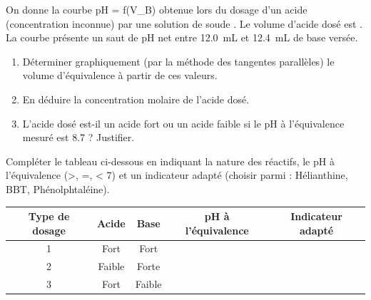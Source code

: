 \documentclass[11pt]{article}
\begin{document}
\begin{exercice}
On donne la courbe pH = f(V\_B) obtenue lors du dosage d'un acide (concentration inconnue) par une solution de soude . Le volume d'acide dosé est . La courbe présente un saut de pH net entre \SI{12,0}{mL} et \SI{12,4}{mL} de base versée.
\begin{enumerate}
    \item Déterminer graphiquement (par la méthode des tangentes parallèles) le volume d'équivalence  à partir de ces valeurs.
    \item En déduire la concentration molaire  de l'acide dosé.
    \item L'acide dosé est-il un acide fort ou un acide faible si le pH à l'équivalence mesuré est \num{8,7} ? Justifier.
\end{enumerate}
\end{exercice}

\begin{exercice}
Compléter le tableau ci-dessous en indiquant la nature des réactifs, le pH à l'équivalence (>, =, < 7) et un indicateur adapté (choisir parmi : Hélianthine, BBT, Phénolphtaléine).

\begin{tabular}{|c|c|c|c|c|}
\hline
\textbf{Type de dosage} & \textbf{Acide} & \textbf{Base} & \textbf{pH à l'équivalence} & \textbf{Indicateur adapté} \\
\hline
1 & Fort & Fort &  &  \\
\hline
2 & Faible & Forte &  &  \\
\hline
3 & Fort & Faible &  &  \\
\hline
\end{tabular}
\end{exercice}
\end{document}
